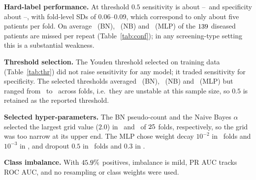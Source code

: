 \documentclass[conference]{IEEEtran}
\begin{document}
\textbf{Hard-label performance.} At threshold $0.5$ sensitivity is about \BNsensMean--\NBsensMean\ and specificity about \BNspecMean--\MLPspecMean, with fold-level SDs of 0.06--0.09, which correspond to only about five patients per fold. On average \BNfnP\ (BN), \NBfnP\ (NB) and \MLPfnP\ (MLP) of the $139$ diseased patients are missed per repeat (Table~\ref{tab:conf}); in any screening-type setting this is a substantial weakness.

\begin{table}[t]
\centering
\caption{Paired bootstrap differences (first minus second model), 95\% intervals.}
\label{tab:paired}
\scriptsize
\resizebox{\columnwidth}{!}{}
\end{table}

\begin{table}[t]
\centering
\caption{Mean confusion counts per repeat (303 patients).}
\label{tab:conf}
\footnotesize

\end{table}

\textbf{Threshold selection.} The Youden threshold selected on training data (Table~\ref{tab:thr}) did not raise sensitivity for any model; it traded sensitivity for specificity. The selected thresholds averaged \BNYoudenMean\ (BN), \NBYoudenMean\ (NB) and \MLPYoudenMean\ (MLP) but ranged from \BNYoudenMin\ to \NBYoudenMax\ across folds, i.e.\ they are unstable at this sample size, so $0.5$ is retained as the reported threshold.

\begin{table}[t]
\centering
\caption{Sensitivity and specificity (fold-level, mean $\pm$ SD) at the fixed and the training-fold Youden threshold.}
\label{tab:thr}
\scriptsize

\end{table}

\textbf{Selected hyper-parameters.} The BN pseudo-count and the Naive Bayes $\alpha$ selected the largest grid value ($2.0$) in \BNalphaTop\ and \NBalphaTop\ of $25$ folds, respectively, so the grid was too narrow at its upper end. The MLP chose weight decay $10^{-2}$ in \WDhigh\ folds and $10^{-3}$ in \WDlow, and dropout $0.5$ in \DOhigh\ folds and $0.3$ in \DOlow.

\textbf{Class imbalance.} With $45.9\%$ positives, imbalance is mild, PR AUC tracks ROC AUC, and no resampling or class weights were used.

\end{document}
